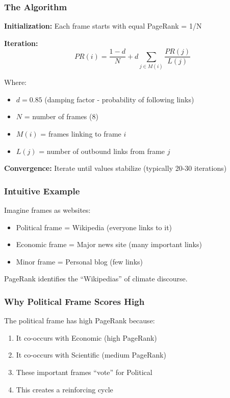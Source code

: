 \documentclass[11pt]{article}
\begin{document}
\subsubsection{The Algorithm}

\begin{tcolorbox}[mybox={PageRank Step-by-Step}]
\textbf{Initialization:}
Each frame starts with equal PageRank = 1/N

\textbf{Iteration:}
\[PR(i) = \frac{1-d}{N} + d \sum_{j \in M(i)} \frac{PR(j)}{L(j)}\]

Where:
\begin{itemize}
    \item $d = 0.85$ (damping factor - probability of following links)
    \item $N$ = number of frames (8)
    \item $M(i)$ = frames linking to frame $i$
    \item $L(j)$ = number of outbound links from frame $j$
\end{itemize}

\textbf{Convergence:}
Iterate until values stabilize (typically 20-30 iterations)
\end{tcolorbox}

\subsubsection{Intuitive Example}

Imagine frames as websites:
\begin{itemize}
    \item Political frame = Wikipedia (everyone links to it)
    \item Economic frame = Major news site (many important links)
    \item Minor frame = Personal blog (few links)
\end{itemize}

PageRank identifies the ``Wikipedias'' of climate discourse.

\subsubsection{Why Political Frame Scores High}

The political frame has high PageRank because:
\begin{enumerate}
    \item It co-occurs with Economic (high PageRank)
    \item It co-occurs with Scientific (medium PageRank)
    \item These important frames ``vote'' for Political
    \item This creates a reinforcing cycle
\end{enumerate}
\end{document}
